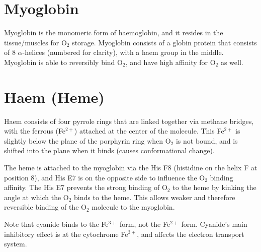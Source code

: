 \section{Myoglobin}

Myoglobin is the monomeric form of haemoglobin, and it resides in the tissue/muscles for O$_2$ storage.
Myoglobin consists of a globin protein that consists of 8 $\alpha$-helices (numbered for clarity), with a haem group in the middle.
Myoglobin is able to reversibly bind O$_2$, and have high affinity for O$_2$ as well.

\section{Haem (Heme)}

Haem consists of four pyrrole rings that are linked together via methane bridges, with the ferrous (Fe$^{2+}$) attached at the center of the molecule.
This Fe$^{2+}$ is slightly below the plane of the porphyrin ring when O$_2$ is not bound, and is shifted into the plane when it binds (causes conformational change).

The heme is attached to the myoglobin via the His F8 (histidine on the helix F at position 8), and His E7 is on the opposite side to influence the O$_2$ binding affinity.
The His E7 prevents the strong binding of O$_2$ to the heme by kinking the angle at which the O$_2$ binds to the heme.
This allows weaker and therefore reversible binding of the O$_2$ molecule to the myoglobin.

Note that cyanide binds to the Fe$^{3+}$ form, not the Fe$^{2+}$ form.
Cyanide's main inhibitory effect is at the cytochrome Fe$^{3+}$, and affects the electron transport system.






